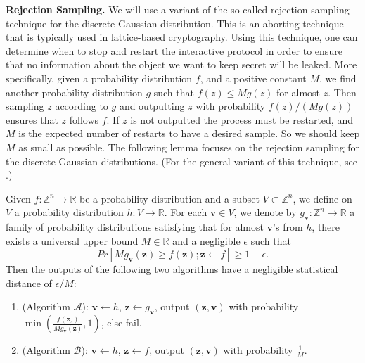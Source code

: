 \documentclass[runningheads]{llncs}
\begin{document}
\iffalse
\noindent    \textbf{Rejection Sampling.} \label{resam}
We will use a variant of the so-called rejection sampling technique for the discrete Gaussian distribution. This is an aborting technique that is typically used in lattice-based cryptography. 
Using this technique, one can determine when to stop and restart the interactive protocol in order to ensure that no information about the object we want to keep secret will be leaked. More specifically,  given a probability distribution $f$, and a positive constant $M$, we find another probability distribution $g$ such that
  $f(z) \leq Mg(z)$ for almost $z$. Then sampling $z$ according to $g$ and outputting $z$ with probability $f(z)/ (Mg(z))$ ensures that $z$ follows $f$. If $z$ is not outputted the process must be restarted, and $M$ is the expected number of restarts to have a desired sample. So we should keep $M$ as small as possible. The following lemma focuses on the rejection sampling for the discrete Gaussian distributions. (For the general variant of this technique, see \cite[Lemma 4.7]{Lyu11}.)

    \begin{lemma}    \label{lem3}
   Given $f:\mathbb{Z}^n \rightarrow \mathbb{R}$ be a probability distribution and a subset $V\subset \mathbb{Z}^n$, we define on $V$ a probability distribution $h:V \rightarrow \mathbb{R}$. For each $\mathbf{v}\in V$, we denote by $g_\mathbf{v}:\mathbb{Z}^n \rightarrow \mathbb{R}$ a family of probability distributions satisfying that for almost $\mathbf{v}$'s from $h$, there exists a universal upper bound $M\in \mathbb{R}$ and a negligible $\epsilon$ such that
        $$Pr[Mg_\mathbf{v}(\mathbf{z}) \geq f(\mathbf{z}); \mathbf{z} \leftarrow f] \geq 1-\epsilon.$$ 
   Then the outputs of the following two algorithms have a negligible statistical distance of  $\epsilon/M$:
        \begin{enumerate}
 
           \item (Algorithm $\mathcal{A}$): $\mathbf{v} \leftarrow h$, $\mathbf{z} \leftarrow g_\mathbf{v} $, output $(\mathbf{z}, \mathbf{v} )$ with probability $\min(\frac{f(\mathbf{z},)}{Mg_{\mathbf{v}}(\mathbf{z})},1)$, else fail.
            \item (Algorithm $\mathcal{B}$): $\mathbf{v} \leftarrow h$, $\mathbf{z} \leftarrow f $, output $(\mathbf{z}, \mathbf{v} )$ with probability $\frac{1}{M}$.
        \end{enumerate}
    \end{lemma}
\end{document}
